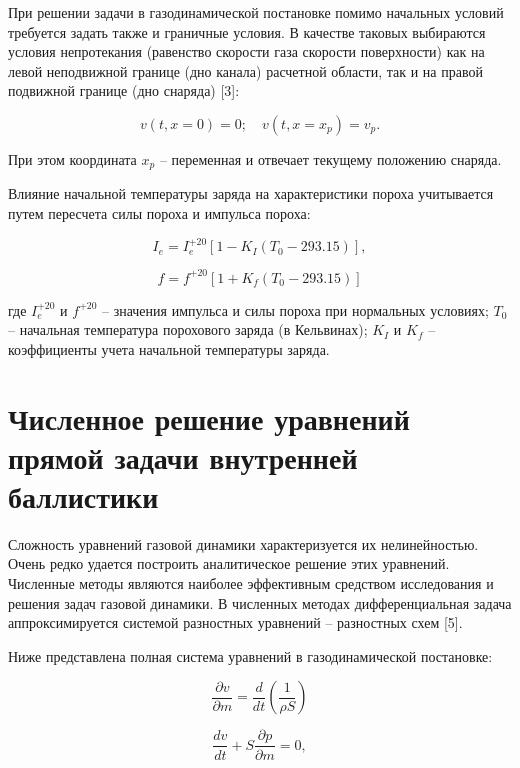 \documentclass[14pt, a4paper]{extreport} %
\begin{document}
При решении задачи в газодинамической постановке помимо начальных условий требуется задать также и граничные условия. В качестве таковых выбираются условия непротекания (равенство скорости газа скорости поверхности) как на левой неподвижной границе (дно канала) расчетной области, так и на правой подвижной границе (дно снаряда) [3]:

\[
v(t, x = 0) = 0; \quad v(t, x = x_p) = v_p.
\]

При этом координата \( x_p \) -- переменная и отвечает текущему положению снаряда.

Влияние начальной температуры заряда на характеристики пороха учитывается путем пересчета силы пороха и импульса пороха:

\begin{equation}
I_e = I_e^{+20} \left[ 1 - K_I \left( T_0 - 293.15 \right) \right],
\end{equation}

\begin{equation}
f = f^{+20} \left[ 1 + K_f \left( T_0 - 293.15 \right) \right]
\end{equation}

где \( I_e^{+20} \) и \( f^{+20} \) -- значения импульса и силы пороха при нормальных условиях;  
\( T_0 \) -- начальная температура порохового заряда (в Кельвинах); \( K_I \) и \( K_f \) -- коэффициенты учета начальной температуры заряда.

\section{Численное решение уравнений прямой задачи внутренней баллистики}

Сложность уравнений газовой динамики характеризуется их нелинейностью. Очень редко удается построить аналитическое решение этих уравнений. Численные методы являются наиболее эффективным средством исследования и решения 
задач газовой динамики. В численных методах дифференциальная задача аппроксимируется системой разностных уравнений -- разностных схем [5].

Ниже представлена полная система уравнений в газодинамической постановке: 

\begin{equation}
\frac{\partial v}{\partial m} = \frac{d}{dt}\left(\frac{1}{\rho S}\right)
\end{equation}

\begin{equation}
\frac{dv}{dt} + S\frac{\partial p}{\partial m} = 0,
\end{equation}
\end{document}
